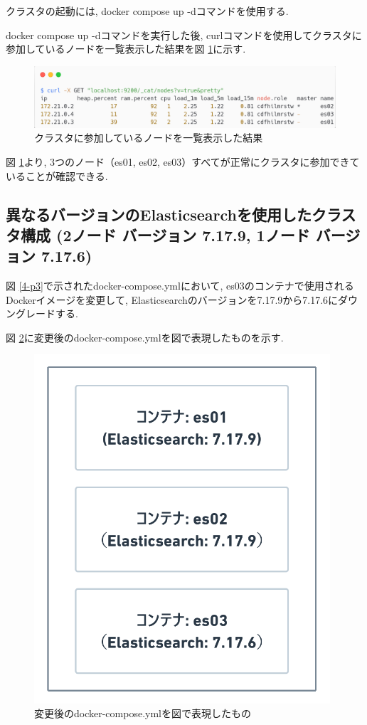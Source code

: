 クラスタの起動には, docker compose up -dコマンドを使用する.

docker compose up -dコマンドを実行した後, curlコマンドを使用してクラスタに参加しているノードを一覧表示した結果を図 \ref{4-p4}に示す.

\begin{figure}[H]
  \begin{center}
    \includegraphics[width=140mm]{sotu/figure/curl-same.png}
    \caption{クラスタに参加しているノードを一覧表示した結果}
    \label{4-p4}
  \end{center}
\end{figure}

図 \ref{4-p4}より, 3つのノード（es01, es02, es03）すべてが正常にクラスタに参加できていることが確認できる.

\subsection{異なるバージョンのElasticsearchを使用したクラスタ構成 (2ノード バージョン 7.17.9, 1ノード バージョン 7.17.6)}

図 \ref{4-p3}で示されたdocker-compose.ymlにおいて, es03のコンテナで使用されるDockerイメージを変更して, Elasticsearchのバージョンを7.17.9から7.17.6にダウングレードする.

図 \ref{4-p5}に変更後のdocker-compose.ymlを図で表現したものを示す.

\begin{figure}[H]
  \begin{center}
    \includegraphics[width=110mm]{sotu/figure/2-7.19.9-and-1-7.17.6.png}
    \caption{変更後のdocker-compose.ymlを図で表現したもの}
    \label{4-p5}
  \end{center}
\end{figure}

